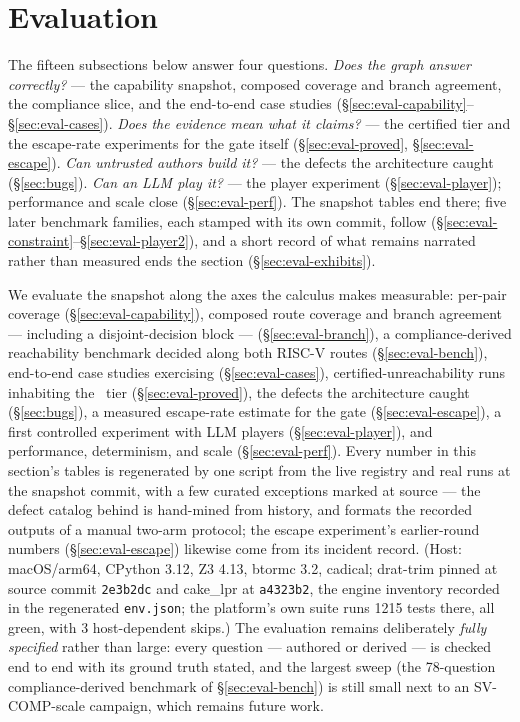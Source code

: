 \section{Evaluation}
\ifarxiv
\noindent The fifteen subsections below answer four questions. \emph{Does
the graph answer correctly?} --- the capability snapshot, composed
coverage and branch agreement, the compliance slice, and the end-to-end
case studies (\S\ref{sec:eval-capability}--\S\ref{sec:eval-cases}).
\emph{Does the evidence mean what it claims?} --- the certified tier
and the escape-rate experiments for the gate itself
(\S\ref{sec:eval-proved}, \S\ref{sec:eval-escape}). \emph{Can
untrusted authors build it?} --- the defects the architecture caught
(\S\ref{sec:bugs}). \emph{Can an LLM play it?} --- the player
experiment (\S\ref{sec:eval-player}); performance and scale close
(\S\ref{sec:eval-perf}). The snapshot tables end there; five later
benchmark families, each stamped with its own commit, follow
(\S\ref{sec:eval-constraint}--\S\ref{sec:eval-player2}), and a
short record of what remains narrated rather than measured ends the
section (\S\ref{sec:eval-exhibits}).
\fi
\label{sec:evaluation}


We evaluate the snapshot along the axes the calculus makes measurable:
per-pair coverage (\S\ref{sec:eval-capability}), composed route
coverage and branch agreement --- including a disjoint-decision block
--- (\S\ref{sec:eval-branch}), a
compliance-derived reachability benchmark decided along both RISC-V
routes (\S\ref{sec:eval-bench}), end-to-end case
studies exercising  (\S\ref{sec:eval-cases}),
certified-unreachability runs inhabiting the \tprov\ tier
(\S\ref{sec:eval-proved}), the defects the architecture caught
(\S\ref{sec:bugs}), a measured escape-rate estimate for the gate
(\S\ref{sec:eval-escape}), a first controlled experiment with LLM
players (\S\ref{sec:eval-player}), and performance, determinism, and
scale (\S\ref{sec:eval-perf}). Every number in this section's tables is
regenerated by one script from
the live registry and real runs at the snapshot commit, with a few
curated exceptions marked at source --- the defect catalog behind
 is hand-mined from history, and 
formats the recorded outputs of a manual two-arm protocol; the escape
experiment's earlier-round numbers (\S\ref{sec:eval-escape}) likewise
come from its incident record. (Host:
macOS/arm64, CPython 3.12, Z3 4.13, btormc 3.2, cadical; drat-trim
pinned at source commit \texttt{2e3b2dc} and cake\_lpr at
\texttt{a4323b2}, the engine inventory recorded in the regenerated
\texttt{env.json}; the platform's own suite runs 1215 tests there, all
green, with 3 host-dependent skips.) The evaluation remains deliberately
\emph{fully specified} rather than large: every question --- authored
or derived --- is checked end to end with its ground truth stated, and
the largest sweep (the 78-question compliance-derived benchmark of
\S\ref{sec:eval-bench}) is still small next to an SV-COMP-scale
campaign, which remains future work.

